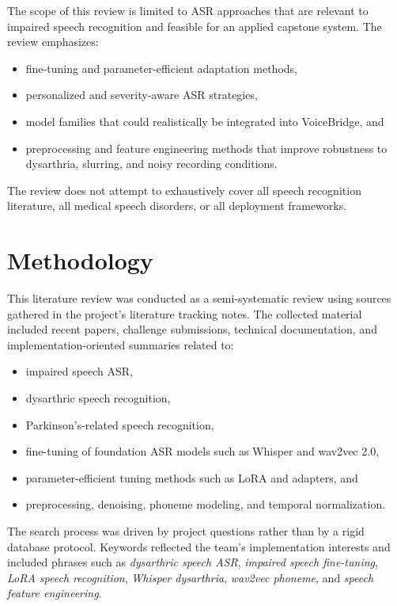 \documentclass{article}
\begin{document}
The scope of this review is limited to ASR approaches that are relevant to impaired speech recognition and feasible for an applied capstone system. The review emphasizes:
\begin{itemize}
    \item fine-tuning and parameter-efficient adaptation methods,
    \item personalized and severity-aware ASR strategies,
    \item model families that could realistically be integrated into VoiceBridge, and
    \item preprocessing and feature engineering methods that improve robustness to dysarthria, slurring, and noisy recording conditions.
\end{itemize}

The review does not attempt to exhaustively cover all speech recognition literature, all medical speech disorders, or all deployment frameworks.

\section{Methodology}

This literature review was conducted as a semi-systematic review using sources gathered in the project's literature tracking notes. The collected material included recent papers, challenge submissions, technical documentation, and implementation-oriented summaries related to:
\begin{itemize}
    \item impaired speech ASR,
    \item dysarthric speech recognition,
    \item Parkinson's-related speech recognition,
    \item fine-tuning of foundation ASR models such as Whisper and wav2vec 2.0,
    \item parameter-efficient tuning methods such as LoRA and adapters, and
    \item preprocessing, denoising, phoneme modeling, and temporal normalization.
\end{itemize}

The search process was driven by project questions rather than by a rigid database protocol. Keywords reflected the team's implementation interests and included phrases such as \emph{dysarthric speech ASR}, \emph{impaired speech fine-tuning}, \emph{LoRA speech recognition}, \emph{Whisper dysarthria}, \emph{wav2vec phoneme}, and \emph{speech feature engineering}.
\end{document}

